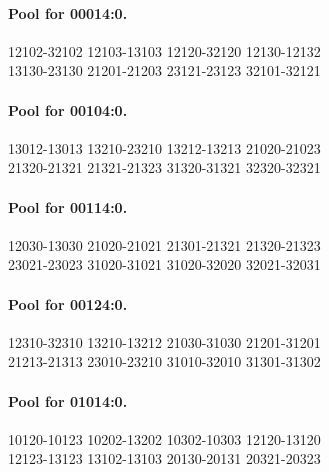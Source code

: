 \documentclass[11pt]{article}
\numberwithin{equation}{section}
\numberwithin{table}{section}
\begin{document}
\paragraph{Pool for 00014:0.}
\begingroup\footnotesize\ttfamily\begin{flushleft}
12102-32102 12103-13103 12120-32120 12130-12132\\
13130-23130 21201-21203 23121-23123 32101-32121\\
\end{flushleft}\endgroup
\paragraph{Pool for 00104:0.}
\begingroup\footnotesize\ttfamily\begin{flushleft}
13012-13013 13210-23210 13212-13213 21020-21023\\
21320-21321 21321-21323 31320-31321 32320-32321\\
\end{flushleft}\endgroup
\paragraph{Pool for 00114:0.}
\begingroup\footnotesize\ttfamily\begin{flushleft}
12030-13030 21020-21021 21301-21321 21320-21323\\
23021-23023 31020-31021 31020-32020 32021-32031\\
\end{flushleft}\endgroup
\paragraph{Pool for 00124:0.}
\begingroup\footnotesize\ttfamily\begin{flushleft}
12310-32310 13210-13212 21030-31030 21201-31201\\
21213-21313 23010-23210 31010-32010 31301-31302\\
\end{flushleft}\endgroup
\paragraph{Pool for 01014:0.}
\begingroup\footnotesize\ttfamily\begin{flushleft}
10120-10123 10202-13202 10302-10303 12120-13120\\
12123-13123 13102-13103 20130-20131 20321-20323\\
\end{flushleft}\endgroup
\end{document}
